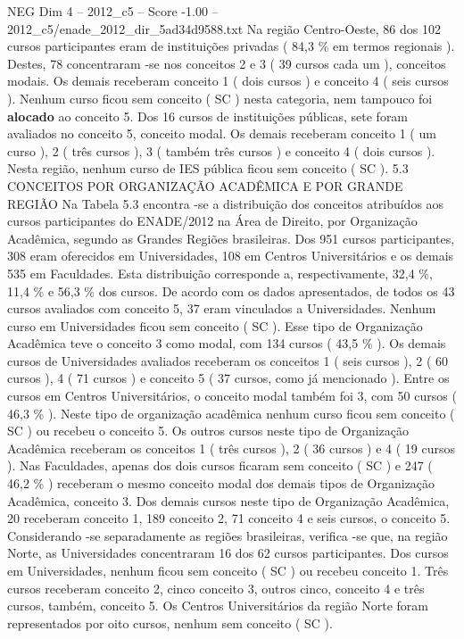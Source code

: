 \begin{textsample}{NEG Dim 4 – 2012\_c5 – Score -1.00 – 2012\_c5/enade\_2012\_dir\_5ad34d9588.txt}
Na região Centro-Oeste, 86 dos 102 cursos participantes eram de instituições privadas ( 84,3 \% em termos regionais ).
Destes, 78 concentraram -se nos conceitos 2 e 3 ( 39 cursos cada um ), conceitos modais.
Os demais receberam conceito 1 ( dois cursos ) e conceito 4 ( seis cursos ).
Nenhum curso ficou sem conceito ( SC ) nesta categoria, nem tampouco foi \textbf{alocado} ao conceito 5.
Dos 16 cursos de instituições públicas, sete foram avaliados no conceito 5, conceito modal.
Os demais receberam conceito 1 ( um curso ), 2 ( três cursos ), 3 ( também três cursos ) e conceito 4 ( dois cursos ).
Nesta região, nenhum curso de IES pública ficou sem conceito ( SC ). 5.3 CONCEITOS POR ORGANIZAÇÃO ACADÊMICA E POR GRANDE REGIÃO Na Tabela 5.3 encontra -se a distribuição dos conceitos atribuídos aos cursos participantes do ENADE/2012 na Área de Direito, por Organização Acadêmica, segundo as Grandes Regiões brasileiras.
Dos 951 cursos participantes, 308 eram oferecidos em Universidades, 108 em Centros Universitários e os demais 535 em Faculdades.
Esta distribuição corresponde a, respectivamente, 32,4 \%, 11,4 \% e 56,3 \% dos cursos.
De acordo com os dados apresentados, de todos os 43 cursos avaliados com conceito 5, 37 eram vinculados a Universidades.
Nenhum curso em Universidades ficou sem conceito ( SC ).
Esse tipo de Organização Acadêmica teve o conceito 3 como modal, com 134 cursos ( 43,5 \% ).
Os demais cursos de Universidades avaliados receberam os conceitos 1 ( seis cursos ), 2 ( 60 cursos ), 4 ( 71 cursos ) e conceito 5 ( 37 cursos, como já mencionado ).
Entre os cursos em Centros Universitários, o conceito modal também foi 3, com 50 cursos ( 46,3 \% ).
Neste tipo de organização acadêmica nenhum curso ficou sem conceito ( SC ) ou recebeu o conceito 5.
Os outros cursos neste tipo de Organização Acadêmica receberam os conceitos 1 ( três cursos ), 2 ( 36 cursos ) e 4 ( 19 cursos ).
Nas Faculdades, apenas dos dois cursos ficaram sem conceito ( SC ) e 247 ( 46,2 \% ) receberam o mesmo conceito modal dos demais tipos de Organização Acadêmica, conceito 3.
Dos demais cursos neste tipo de Organização Acadêmica, 20 receberam conceito 1, 189 conceito 2, 71 conceito 4 e seis cursos, o conceito 5.
Considerando -se separadamente as regiões brasileiras, verifica -se que, na região Norte, as Universidades concentraram 16 dos 62 cursos participantes.
Dos cursos em Universidades, nenhum ficou sem conceito ( SC ) ou recebeu conceito 1.
Três cursos receberam conceito 2, cinco conceito 3, outros cinco, conceito 4 e três cursos, também, conceito 5.
Os Centros Universitários da região Norte foram representados por oito cursos, nenhum sem conceito ( SC ).

\end{textsample}
